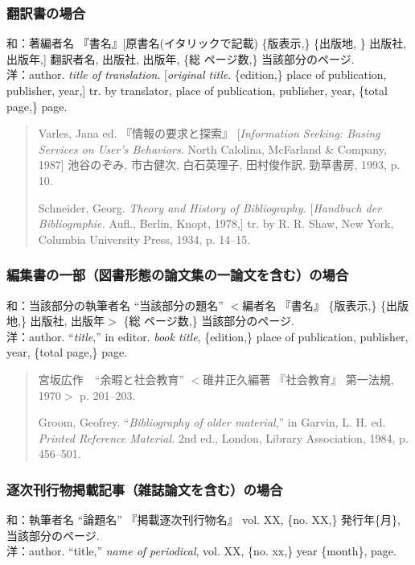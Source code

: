 \documentclass[b5paper,10pt,twocolumn,tombow]{jarticle}
\begin{document}
\subsubsection{翻訳書の場合}
\noindent{}和：著編者名 『書名』[原書名(イタリックで記載) \{版表示,\}
\{出版地, \} 出版社, 出版年,] 翻訳者名, 出版社, 出版年, \{総
\bigskip
ページ数,\} 当該部分のページ.\\
洋：author. \textit{title of translation}. [\textit{original
title}. \{edition,\} place of publication, publisher, year,] tr. by
translator, place of publication, publisher, year, \{total page,\} page.

\begin{quote}
Varles, Jana ed. 『情報の要求と探索』 [\textit{Information Seeking:
 Basing Services on User's Behaviors.} North Calolina,
 McFarland \& Company, 1987] 池谷のぞみ, 市古健次, 白石英理子, 田村俊作訳,
 勁草書房, 1993, p. 10.

Schneider, Georg. \textit{Theory and History of Bibliography.}
 [\textit{Handbuch der Bibliographie.} Aufl., Berlin, Knopt, 1978,]
 tr. by R. R. Shaw, New York, Columbia University Press, 1934, p. 14--15.
\end{quote}

\subsubsection{編集書の一部（図書形態の論文集の一論文を含む）の場合}
\noindent{}和：当該部分の執筆者名 ``当該部分の題名'' $<$編者名 『書名』 \{版表示,\} \{出版地,\} 出版社, 出版年$>$ \{総
\bigskip
ページ数,\} 当該部分のページ.\\
洋：author. ``\textit{title},'' in editor. \textit{book title}, \{edition,\} place of publication,
publisher, year, \{total page,\} page.

\begin{quote}
宮坂広作　``余暇と社会教育'' $<$碓井正久編著 『社会教育』 第一法規,
 1970$>$ p. 201--203.

Groom, Geofrey. ``\textit{Bibliography of older material},'' in Garvin,
 L. H. ed. \textit{Printed Reference Material.} 2nd ed., London, Library
 Association, 1984, p. 456--501.
\end{quote}


\subsubsection{逐次刊行物掲載記事（雑誌論文を含む）の場合}
\noindent{}和：執筆者名 ``論題名'' 『掲載逐次刊行物名』 vol. XX,
\{no. XX,\} 発行年\{月\}, 当該部分のページ.\\
洋：author. ``title,'' \textit{name of periodical}, vol. XX,
\{no. xx,\} year \{month\}, page.
\end{document}
